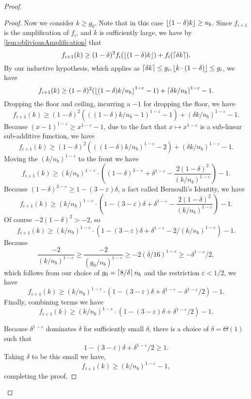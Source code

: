 \begin{proof}
\begin{proof}
  Now we consider $k \ge g_0$. Note that in this case $\left\lfloor (1-\delta)k \right\rfloor \ge n_b$.
  Since $f_{i+1}$ is the amplification of $f_i$, and $k$ is sufficiently large, we have by \cref{lem:obliviousAmplification} that
  $$f_{i+1}(k) \ge (1-\delta)^2 f_i(\left\lfloor (1-\delta)k \right\rfloor) + f_i(\left\lceil \delta k \right\rceil).$$
  By our inductive hypothesis, which applies as $\left\lceil \delta k \right\rceil\le g_i, \left\lfloor k\cdot (1-\delta) \right\rfloor \le g_i$, we have
  $$f_{i+1}(k) \ge (1-\delta)^2 (\left\lfloor (1-\delta)k/n_b \right\rfloor^{1-\varepsilon}-1) + \left\lceil \delta k/n_b \right\rceil^{1-\varepsilon} - 1. $$
  Dropping the floor and ceiling, incurring a $-1$ for dropping the floor, we have
  $$f_{i+1}(k) \ge (1-\delta)^2 (((1-\delta)k/n_b-1)^{1-\varepsilon}-1) + (\delta k/n_b)^{1-\varepsilon} - 1.$$
  Because $(x-1)^{1-\varepsilon} \ge x^{1-\varepsilon} -1$, due to the
  fact that $x\mapsto x^{1-\varepsilon}$ is a sub-linear
  sub-additive function, we have 
  $$f_{i+1}(k) \ge (1-\delta)^2 (((1-\delta)k/n_b)^{1-\varepsilon}-2) + (\delta k/n_b)^{1-\varepsilon}-1.$$
  Moving the $(k/n_b)^{1-\varepsilon}$ to the front we have
  $$ f_{i+1}(k) \ge (k/n_b)^{1-\varepsilon} \cdot\left((1-\delta)^{3-\varepsilon} + \delta^{1-\varepsilon} - \frac{2(1-\delta)^2}{(k/n_b)^{1-\varepsilon}} \right) -1.$$
  Because $(1-\delta)^{3-\varepsilon} \ge 1-(3-\varepsilon)\delta$, a fact called Bernoulli's Identity, we have
  $$f_{i+1}(k) \ge (k/n_b)^{1-\varepsilon} \cdot\left(1-(3-\varepsilon)\delta + \delta^{1-\varepsilon} - \frac{2(1-\delta)^2}{(k/n_b)^{1-\varepsilon}} \right)-1.$$
  Of course $-2(1-\delta)^2 > -2$, so 
  $$f_{i+1}(k) \ge (k/n_b)^{1-\varepsilon} \cdot\left(1-(3-\varepsilon)\delta + \delta^{1-\varepsilon} - 2/(k/n_b)^{1-\varepsilon} \right) -1.$$
  Because $$\frac{-2}{(k/n_b)^{1-\varepsilon}} \ge \frac{-2}{(g_0/n_b)^{1-\varepsilon}} \ge -2(\delta/16)^{1-\varepsilon} \ge -\delta^{1-\varepsilon}/2,$$
  which follows from our choice of $g_0 = \left\lceil 8/\delta \right\rceil n_b$ and the restriction
  $\varepsilon<1/2$, we have 
  $$f_{i+1}(k) \ge (k/n_b)^{1-\varepsilon} \cdot\left(1-(3-\varepsilon)\delta + \delta^{1-\varepsilon} - \delta^{1-\varepsilon}/2 \right)-1.$$
  Finally, combining terms we have
  $$f_{i+1}(k) \ge  (k/n_b)^{1-\varepsilon} \cdot\left(1-(3-\varepsilon)\delta + \delta^{1-\varepsilon}/2\right)-1. $$

  Because $\delta^{1-\varepsilon}$ dominates $\delta$ for
  sufficiently small $\delta$, there is a choice of
  $\delta=\Theta(1)$ such that 
  $$1-(3-\varepsilon)\delta + \delta^{1-\varepsilon}/2 \ge 1.$$ 
  Taking $\delta$ to be this small we have,
  $$f_{i+1}(k) \ge (k/n_b)^{1-\varepsilon}-1,$$
  completing the proof. 
  \end{proof}


\end{proof}

